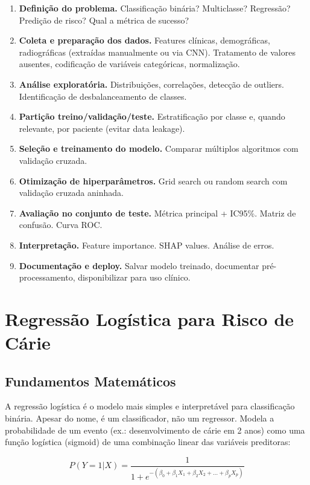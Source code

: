 \begin{enumerate}
    \item \textbf{Definição do problema.} Classificação binária? Multiclasse? Regressão? Predição de risco? Qual a métrica de sucesso?
    \item \textbf{Coleta e preparação dos dados.} Features clínicas, demográficas, radiográficas (extraídas manualmente ou via CNN). Tratamento de valores ausentes, codificação de variáveis categóricas, normalização.
    \item \textbf{Análise exploratória.} Distribuições, correlações, detecção de outliers. Identificação de desbalanceamento de classes.
    \item \textbf{Partição treino/validação/teste.} Estratificação por classe e, quando relevante, por paciente (evitar data leakage).
    \item \textbf{Seleção e treinamento do modelo.} Comparar múltiplos algoritmos com validação cruzada.
    \item \textbf{Otimização de hiperparâmetros.} Grid search ou random search com validação cruzada aninhada.
    \item \textbf{Avaliação no conjunto de teste.} Métrica principal + IC95\%. Matriz de confusão. Curva ROC.
    \item \textbf{Interpretação.} Feature importance. SHAP values. Análise de erros.
    \item \textbf{Documentação e deploy.} Salvar modelo treinado, documentar pré-processamento, disponibilizar para uso clínico.
\end{enumerate}

\section{Regressão Logística para Risco de Cárie}

\subsection{Fundamentos Matemáticos}

A regressão logística  é o modelo mais simples e interpretável para classificação binária. Apesar do nome, é um classificador, não um regressor. Modela a probabilidade de um evento (ex.: desenvolvimento de cárie em 2 anos) como uma função logística (sigmoid) de uma combinação linear das variáveis preditoras:

\begin{equation}
P(Y=1 | X) = \frac{1}{1 + e^{-(\beta_0 + \beta_1 X_1 + \beta_2 X_2 + \ldots + \beta_p X_p)}}
\end{equation}


